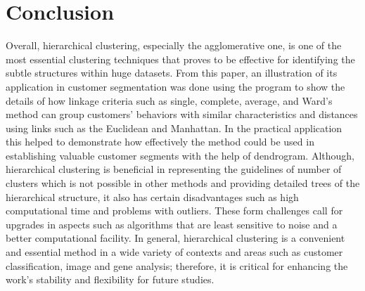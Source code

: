 \documentclass[conference]{IEEEtran}
\begin{document}
\section{Conclusion}
Overall, hierarchical clustering, especially the agglomerative one, is one of the most essential clustering techniques that proves to be effective for identifying the subtle structures within huge datasets. From this paper, an illustration of its application in customer segmentation was done using the program to show the details of how linkage criteria such as single, complete, average, and Ward’s method can group customers’ behaviors with similar characteristics and distances using links such as the Euclidean and Manhattan. In the practical application this helped to demonstrate how effectively the method could be used in establishing valuable customer segments with the help of dendrogram. Although, hierarchical clustering is beneficial in representing the guidelines of number of clusters which is not possible in other methods and providing detailed trees of the hierarchical structure, it also has certain disadvantages such as high computational time and problems with outliers. These form challenges call for upgrades in aspects such as algorithms that are least sensitive to noise and a better computational facility. In general, hierarchical clustering is a convenient and essential method in a wide variety of contexts and areas such as customer classification, image and gene analysis; therefore, it is critical for enhancing the work’s stability and flexibility for future studies.



\end{document}
